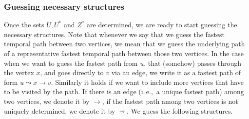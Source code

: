 \documentclass[a4paper,UKenglish,cleveref, autoref, thm-restate]{lipics-v2021}
\newcommand{\ie}{i.\,e.,\ }
\begin{document}
\subsubsection{Guessing necessary structures \label{sec:FPT-guessing}}
Once the sets $U, U^*$ and $Z^*$ are determined, we are ready to start guessing  the necessary structures.
Note that whenever we say that we guess the fastest temporal path between two vertices, we mean that we guess the underlying path of a representative fastest temporal path between those two vertices.
In the case when we want to guess the fastest path from $u$, that (somehow) passes through the vertex $x$, and goes directly to $v$ via an edge, we write it as a fastest path of form $u \leadsto x \rightarrow v$.
Similarly it holds if we want to include more vertices that have to be visited by the path. If there is an edge (\ie a unique fastest path) among two vertices, we denote it by $\rightarrow$,
if the fastest path among two vertices is not uniquely determined, we denote it by $\leadsto$.
We guess the following structures.
\end{document}
